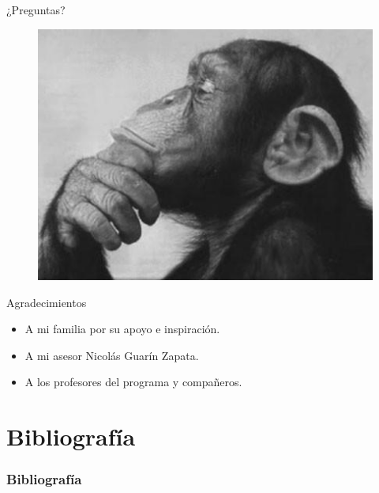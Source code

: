 \documentclass[xcolor=table,serif]{beamer}
\begin{document}
	\begin{frame}{¿Preguntas?}
	\begin{figure}
	\centering
	\includegraphics[scale=0.5]{thinker.jpeg}	
	\end{figure}

	\end{frame}
	\begin{frame}{Agradecimientos}
	\begin{itemize}
		\item<1-> A mi familia por su apoyo e inspiración.
		\item<2-> A mi asesor Nicolás Guarín Zapata.
		\item<3-> A los profesores del programa y compañeros.
	\end{itemize}		
	\end{frame}
	
\section{Bibliograf\'ia}
  \begin{frame}[allowframebreaks]
  \frametitle{Bibliograf\'ia}
  
  
  \end{frame}
\end{document}
